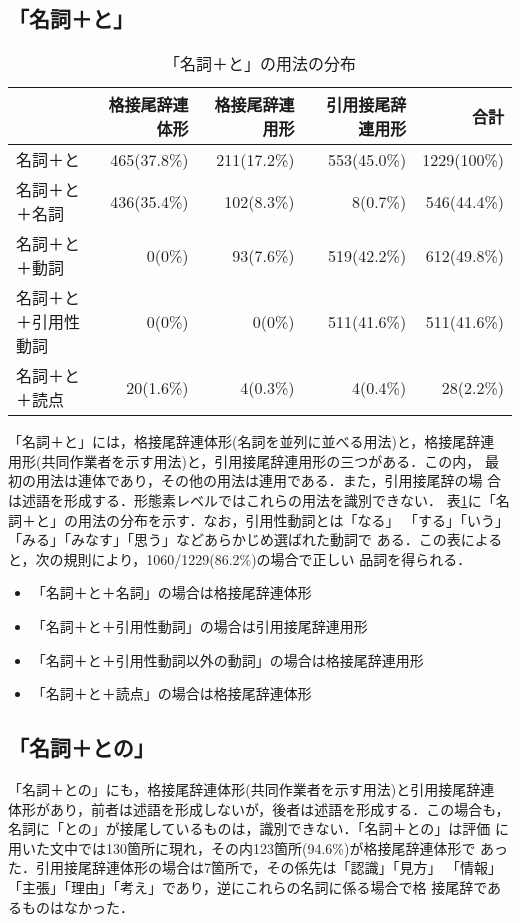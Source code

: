 \subsection{「名詞＋と」}
\begin{table}
\begin{center}
\begin{tabular}{|l|r|r|r|r|} \hline
               & 格接尾辞連体形 & 格接尾辞連用形 & 引用接尾辞連用形 & 合計 \\
\hline
名詞＋と       & 465(37.8\%)    & 211(17.2\%)    & 553(45.0\%)      & 1229(100\%) \\
名詞＋と＋名詞 & 436(35.4\%)    & 102(8.3\%)     & 8(0.7\%)         & 546(44.4\%) \\
名詞＋と＋動詞 & 0(0\%)         & 93(7.6\%)      & 519(42.2\%)      & 612(49.8\%) \\
名詞＋と＋引用性動詞 & 0(0\%)   & 0(0\%)         & 511(41.6\%)      & 511(41.6\%) \\
名詞＋と＋読点 & 20(1.6\%)      & 4(0.3\%)       & 4(0.4\%)         & 28(2.2\%) \\
\hline
\end{tabular}
\end{center}
\caption{「名詞＋と」の用法の分布}
\label{to}
\end{table}

「名詞＋と」には，格接尾辞連体形(名詞を並列に並べる用法)と，格接尾辞連
用形(共同作業者を示す用法)と，引用接尾辞連用形の三つがある．この内，
最初の用法は連体であり，その他の用法は連用である．また，引用接尾辞の場
合は述語を形成する．形態素レベルではこれらの用法を識別できない．
表\ref{to}に「名詞＋と」の用法の分布を示す．なお，引用性動詞とは「なる」
「する」「いう」「みる」「みなす」「思う」などあらかじめ選ばれた動詞で
ある．この表によると，次の規則により，1060/1229(86.2\%)の場合で正しい
品詞を得られる．
\begin{itemize}
\item 「名詞＋と＋名詞」の場合は格接尾辞連体形
\item 「名詞＋と＋引用性動詞」の場合は引用接尾辞連用形
\item 「名詞＋と＋引用性動詞以外の動詞」の場合は格接尾辞連用形
\item 「名詞＋と＋読点」の場合は格接尾辞連体形
\end{itemize}

\subsection{「名詞＋との」}
「名詞＋との」にも，格接尾辞連体形(共同作業者を示す用法)と引用接尾辞連
体形があり，前者は述語を形成しないが，後者は述語を形成する．この場合も，
名詞に「との」が接尾しているものは，識別できない．「名詞＋との」は評価
に用いた文中では130箇所に現れ，その内123箇所(94.6\%)が格接尾辞連体形で
あった．引用接尾辞連体形の場合は7箇所で，その係先は「認識」「見方」
「情報」「主張」「理由」「考え」であり，逆にこれらの名詞に係る場合で格
接尾辞であるものはなかった．

